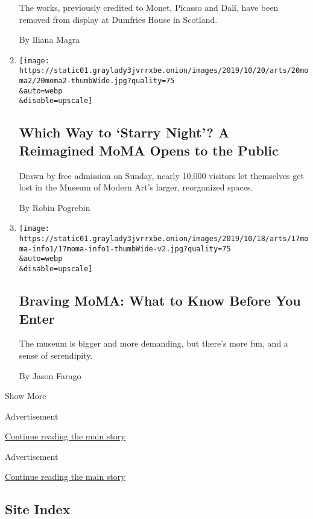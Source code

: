\begin{enumerate}
  The works, previously credited to Monet, Picasso and Dalí, have been
  removed from display at Dumfries House in Scotland.

  By Iliana Magra
\item
  \href{/2019/10/20/arts/design/Moma-renovation-opening.html}{}

  \texttt{[image: https://static01.graylady3jvrrxbe.onion/images/2019/10/20/arts/20moma2/20moma2-thumbWide.jpg?quality=75\\\&auto=webp\\\&disable=upscale]}

  \hypertarget{which-way-to-starry-night-a-reimagined-moma-opens-to-the-public}{%
  \subsection{Which Way to `Starry Night'? A Reimagined MoMA Opens to
  the
  Public}\label{which-way-to-starry-night-a-reimagined-moma-opens-to-the-public}}

  Drawn by free admission on Sunday, nearly 10,000 visitors let
  themselves get lost in the Museum of Modern Art's larger, reorganized
  spaces.

  By Robin Pogrebin
\item
  \href{/2019/10/17/arts/design/new-moma-what-to-know.html}{}

  \texttt{[image: https://static01.graylady3jvrrxbe.onion/images/2019/10/18/arts/17moma-info1/17moma-info1-thumbWide-v2.jpg?quality=75\\\&auto=webp\\\&disable=upscale]}

  \hypertarget{braving-moma-what-to-know-before-you-enter}{%
  \subsection{Braving MoMA: What to Know Before You
  Enter}\label{braving-moma-what-to-know-before-you-enter}}

  The museum is bigger and more demanding, but there's more fun, and a
  sense of serendipity.

  By Jason Farago
\end{enumerate}

Show More

Advertisement

\protect\hyperlink{after-mid1}{Continue reading the main story}

Advertisement

\protect\hyperlink{after-mktg}{Continue reading the main story}

\hypertarget{site-index}{%
\subsection{Site Index}\label{site-index}}

